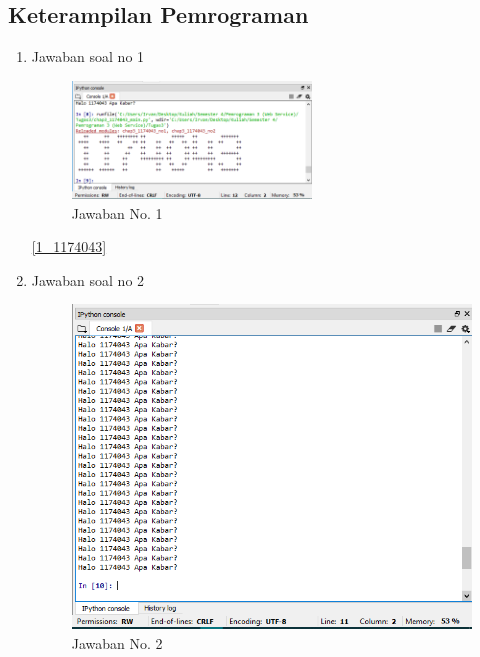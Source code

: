	\subsection{Keterampilan Pemrograman}
		\begin{enumerate}
			\item Jawaban soal no 1
				
				
				\begin{figure} [ht]
					\centerline{\includegraphics[width=0.6\textwidth]{figures/chapter3/1_1174043.png}}
					\caption{Jawaban No. 1}
					\label{1}
				\end{figure}

				\ref{1_1174043}
				
			\item Jawaban soal no 2
				
				
				\begin{figure} [ht]
					\centerline{\includegraphics[width=1\textwidth]{figures/chapter3/2_1174043.png}}
					\caption{Jawaban No. 2}
					\label{2}
				\end{figure}


\end{enumerate}
